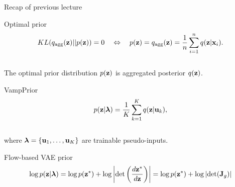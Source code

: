 \begin{frame}{Recap of previous lecture}
	\begin{block}{Optimal prior}
		\vspace{-0.6cm}
		\[
			KL(q_{\text{agg}}(\mathbf{z}) || p(\mathbf{z})) = 0 \quad \Leftrightarrow \quad p (\mathbf{z}) = q_{\text{agg}}(\mathbf{z}) = \frac{1}{n} \sum_{i=1}^n q(\mathbf{z} | \mathbf{x}_i).
		\]
		\vspace{-0.4cm}\\
		The optimal prior distribution $p(\mathbf{z})$ is aggregated posterior $q(\mathbf{z})$.
	\end{block}

	\begin{block}{VampPrior}
		\vspace{-0.4cm}
		\[
		p(\mathbf{z} | \boldsymbol{\lambda}) = \frac{1}{K} \sum_{k=1}^K q(\mathbf{z} | \mathbf{u}_k),
		\]
		\vspace{-0.2cm} \\
		where $\boldsymbol{\lambda} = \{\mathbf{u}_1, \dots, \mathbf{u}_K\}$ are trainable pseudo-inputs.
	\end{block}
	\begin{block}{Flow-based VAE prior}
		\vspace{-0.5cm}
		\[
			\log p(\mathbf{z} | \boldsymbol{\lambda}) = \log p(\mathbf{z}^*) + \log \left| \det \left( \frac{d \mathbf{z}^*}{d\mathbf{z}} \right) \right| = \log p(\mathbf{z}^*) + \log \left| \det ( \mathbf{J}_g) \right| 
		\]
	\end{block}
\end{frame}
